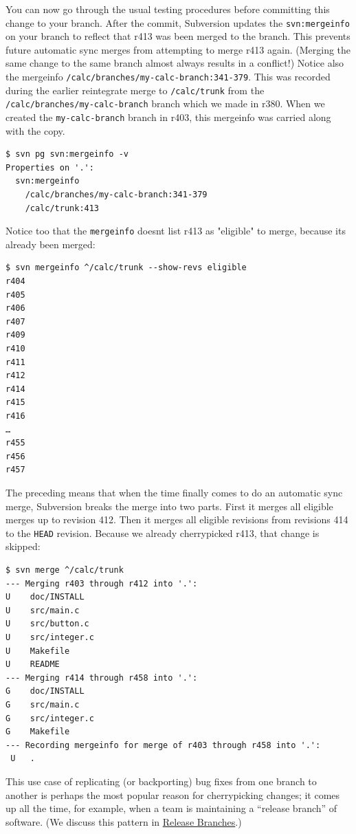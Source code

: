You can now go through the usual testing procedures before committing
this change to your branch. After the commit, Subversion updates the
\texttt{svn:mergeinfo} on your branch to reflect that r413 was been
merged to the branch. This prevents future automatic sync merges from
attempting to merge r413 again. (Merging the same change to the same
branch almost always results in a conflict!) Notice also the mergeinfo
\texttt{/calc/branches/my-calc-branch:341-379}. This was recorded during
the earlier reintegrate merge to \texttt{/calc/trunk} from the
\texttt{/calc/branches/my-calc-branch} branch which we made in r380.
When we created the \texttt{my-calc-branch} branch in r403, this
mergeinfo was carried along with the copy.

\begin{verbatim}
$ svn pg svn:mergeinfo -v
Properties on '.':
  svn:mergeinfo
    /calc/branches/my-calc-branch:341-379
    /calc/trunk:413
\end{verbatim}

Notice too that the \texttt{mergeinfo} doesn\textquotesingle t list r413
as "eligible" to merge, because it\textquotesingle s already been
merged:

\begin{verbatim}
$ svn mergeinfo ^/calc/trunk --show-revs eligible
r404
r405
r406
r407
r409
r410
r411
r412
r414
r415
r416
…
r455
r456
r457
\end{verbatim}

The preceding means that when the time finally comes to do an automatic
sync merge, Subversion breaks the merge into two parts. First it merges
all eligible merges up to revision 412. Then it merges all eligible
revisions from revisions 414 to the \texttt{HEAD} revision. Because we
already cherrypicked r413, that change is skipped:

\begin{verbatim}
$ svn merge ^/calc/trunk
--- Merging r403 through r412 into '.':
U    doc/INSTALL
U    src/main.c
U    src/button.c
U    src/integer.c
U    Makefile
U    README
--- Merging r414 through r458 into '.':
G    doc/INSTALL
G    src/main.c
G    src/integer.c
G    Makefile
--- Recording mergeinfo for merge of r403 through r458 into '.':
 U   .
\end{verbatim}

This use case of replicating (or backporting) bug fixes from one branch
to another is perhaps the most popular reason for cherrypicking changes;
it comes up all the time, for example, when a team is maintaining a
``release branch'' of software. (We discuss this pattern in
\hyperref[svn.branchmerge.commonpatterns.release]{Release Branches}.)

